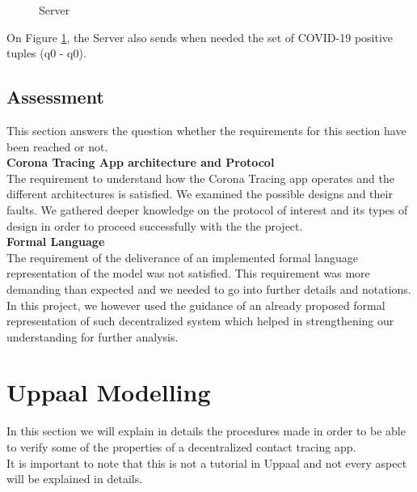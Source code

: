 \documentclass[a4paper, twocolumn]{article}
\begin{document}
\begin{figure}[H]
    \centering
    \caption{Server}
    \label{fig:server} 
\end{figure}
\noindent On Figure \ref{fig:server}, the Server also sends when needed the set of COVID-19 positive tuples (q0 - q0).

\subsection{Assessment}
This section answers the question whether the requirements for this section have been reached or not.\\

\noindent \textbf{Corona Tracing App architecture and Protocol}\\
The requirement to understand how the Corona Tracing app operates and the different architectures is satisfied. We examined the possible designs and their faults. We gathered deeper knowledge on the protocol of interest and its types of design in order to proceed successfully with the the project.\\

\noindent \textbf{Formal Language}\\
The requirement of the deliverance of an implemented formal language representation of the model was not satisfied. This requirement was more demanding than expected and we needed to go into further details and notations. In this project, we however used the guidance of an already proposed formal representation of such decentralized system which helped in strengthening our understanding for further analysis.

\section{ Uppaal Modelling}
In this section we will explain in details the procedures made in order to be able to verify some of the properties of a decentralized contact tracing app.\\
It is important to note that this is not a tutorial in Uppaal and not every aspect will be explained in details.
\label{sec-production}
\end{document}
